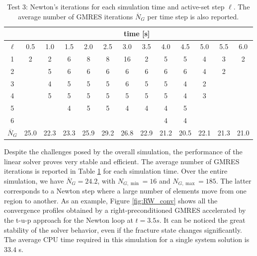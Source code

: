\documentclass[3p,times]{elsarticle}
\theoremstyle{plain}
\begin{document}
\begin{table}%
  \centering
  \begin{tabular}{c|c|c|c|c|c|c|c|c|c|c|c|c|}
    & \multicolumn{12}{|c|}{time [s]} \\
    \hline
    $\ell$ & 0.5 & 1.0 & 1.5 & 2.0 & 2.5 & 3.0 & 3.5 & 4.0 & 4.5 & 5.0 & 5.5 & 6.0 \\
    \hline
    1 & 2 & 2 & 6 & 8 & 8 & 16 & 2 & 5 & 5 & 4 & 3 & 2 \\
    2 &   & 5 & 6 & 6 & 6 &  6 & 6 & 6 & 6 & 4 & 2 &   \\
    3 &   & 4 & 5 & 5 & 5 &  6 & 5 & 5 & 4 & 2 &   &   \\
    4 &   & 5 & 5 & 5 & 5 &  5 & 5 & 5 & 4 & 3 &   &   \\
    5 &   &   & 4 & 5 & 5 &  4 & 4 & 4 & 5 &   &   &   \\
    6 &   &   &   &   &   &    &   & 4 & 4 &   &   &   \\
    \hline
    $\overline{N}_G$ & 25.0 & 22.3 & 23.3 & 25.9 & 29.2 & 26.8 & 22.9 & 21.2 & 20.5 & 22.1 & 21.3 & 21.0 \\
  \end{tabular}
  \caption{Test 3: Newton's iterations for each simulation time and active-set step $\ell$. The average number of GMRES iterations $\overline{N}_G$ per time step is also reported. %
  }
  \label{tab:RW_nolin}
\end{table}

Despite the challenges posed by the overall simulation, the performance of the linear solver proves very stable and efficient.
The average number of GMRES iterations is reported in Table \ref{tab:RW_nolin} for each simulation time. Over the entire simulation, we have $\overline{N}_G=24.2$, with $N_{G,\min}=16$ and $N_{G,\max}=185$. The latter corresponds to a Newton step where a large number of elements move from one region to another. As an example, Figure \ref{fig:RW_conv} shows all the convergence profiles obtained by a right-preconditioned GMRES accelerated by the t-u-p approach for the Newton loop at $t = 3.5s$. It can be noticed the great stability of the solver behavior, even if the fracture state changes significantly. %
The average CPU time required in this simulation for a single system solution is $33.4$ s.

\end{document}
